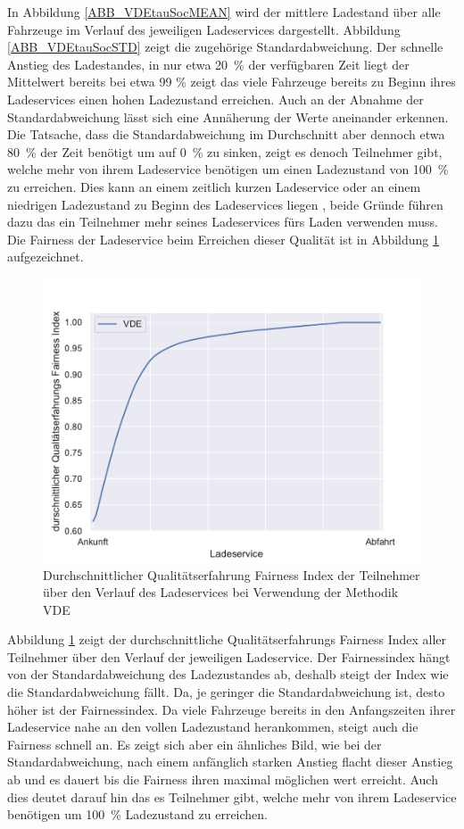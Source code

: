In Abbildung \ref{ABB_VDEtauSocMEAN} wird der mittlere Ladestand über alle Fahrzeuge im Verlauf des jeweiligen Ladeservices dargestellt. Abbildung \ref{ABB_VDEtauSocSTD} zeigt die zugehörige Standardabweichung. Der schnelle Anstieg des Ladestandes, in nur etwa 20~\% der verfügbaren Zeit liegt der Mittelwert bereits bei etwa 99 \% zeigt das viele Fahrzeuge bereits zu Beginn ihres Ladeservices einen hohen Ladezustand erreichen. Auch an der Abnahme der Standardabweichung lässt sich eine Annäherung der Werte aneinander erkennen. Die Tatsache, dass die Standardabweichung im Durchschnitt aber dennoch etwa 80~\% der Zeit benötigt um auf 0~\% zu sinken, zeigt es denoch Teilnehmer gibt, welche mehr von ihrem Ladeservice benötigen um einen Ladezustand von 100~\% zu erreichen. Dies kann an einem zeitlich kurzen Ladeservice oder an einem niedrigen Ladezustand zu Beginn des Ladeservices liegen , beide Gründe führen dazu das ein Teilnehmer mehr seines Ladeservices fürs Laden verwenden muss. Die Fairness der Ladeservice beim Erreichen dieser Qualität ist in Abbildung \ref{Abb_VDEtauFairness} aufgezeichnet. 
\begin{figure}[h]
\centering
	\includegraphics[scale=0.45]{img/VDE_tau/tau_VDE_2_qoe.pdf}
	\caption{Durchschnittlicher Qualitätserfahrung Fairness Index der Teilnehmer über den Verlauf des Ladeservices bei Verwendung der Methodik VDE}
	\label{Abb_VDEtauFairness}
\end{figure}

Abbildung \ref{Abb_VDEtauFairness} zeigt der durchschnittliche Qualitätserfahrungs Fairness Index aller Teilnehmer über den Verlauf der jeweiligen Ladeservice. Der Fairnessindex hängt von der Standardabweichung des Ladezustandes ab, deshalb steigt der Index wie die Standardabweichung fällt. Da, je geringer die Standardabweichung ist, desto höher ist der Fairnessindex. Da viele Fahrzeuge bereits in den Anfangszeiten ihrer Ladeservice nahe an den vollen Ladezustand herankommen, steigt auch die Fairness schnell an. Es zeigt sich aber ein ähnliches Bild, wie bei der Standardabweichung, nach einem anfänglich starken Anstieg flacht dieser Anstieg ab und es dauert bis die Fairness ihren maximal möglichen wert erreicht. Auch dies deutet darauf hin das es Teilnehmer gibt, welche mehr von ihrem Ladeservice benötigen um 100~\% Ladezustand zu erreichen.

